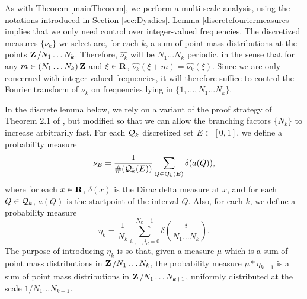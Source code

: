 As with Theorem \ref{mainTheorem}, we perform a multi-scale analysis, using the notations introduced in Section \ref{sec:Dyadics}. Lemma \ref{discretefouriermeasures} implies that we only need control over integer-valued frequencies. The discretized measures $\{ \nu_k \}$ we select are, for each $k$, a sum of point mass distributions at the points $\operatorname{\mathbf{Z}}/N_1 \dots N_k$. Therefore, $\widehat{\nu_k}$ will be $N_1 \dots N_k$ periodic, in the sense that for any $m \in (N_1 \dots N_k) \operatorname{\mathbf{Z}}$ and $\xi \in \operatorname{\mathbf{R}}$, $\widehat{\nu_k}(\xi + m) = \widehat{\nu_k}(\xi)$. Since we are only concerned with integer valued frequencies, it will therefore suffice to control the Fourier transform of $\nu_k$ on frequencies lying in $\{ 1, \dots, N_1 \dots N_k \}$.

In the discrete lemma below, we rely on a variant of the proof strategy of Theorem 2.1 of \cite{Shmerkin}, but modified so that we can allow the branching factors $\{ N_k \}$ to increase arbitrarily fast. For each $\operatorname{\mathcal{Q}}_k$ discretized set $E \subset [0,1]$, we define a probability measure
%
\[ \nu_E = \frac{1}{\#(\operatorname{\mathcal{Q}}_k(E))} \sum_{Q \in \operatorname{\mathcal{Q}}_k(E)} \delta(a(Q)), \]
%
where for each $x \in \operatorname{\mathbf{R}}$, $\delta(x)$ is the Dirac delta measure at $x$, and for each $Q \in \operatorname{\mathcal{Q}}_k$, $a(Q)$ is the startpoint of the interval $Q$. Also, for each $k$, we define a probability measure
%
\[ \eta_k = \frac{1}{N_k} \sum_{i_1, \dots, i_d = 0}^{N_k - 1} \delta \left( \frac{i}{N_1 \dots N_k} \right).  \]
%
The purpose of introducing $\eta_k$ is so that, given a measure $\mu$ which is a sum of point mass distributions in $\operatorname{\mathbf{Z}}/N_1 \dots N_k$, the probability measure $\mu * \eta_{k+1}$ is a sum of point mass distributions in $\operatorname{\mathbf{Z}}/N_1 \dots N_{k+1}$, uniformly distributed at the scale $1/N_1 \dots N_{k+1}$.


